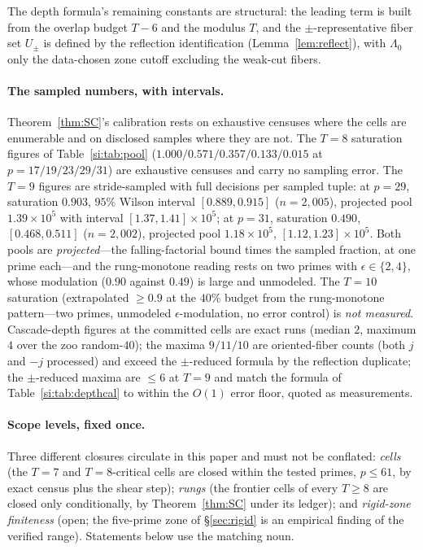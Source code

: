 The depth formula's remaining constants are structural: the leading
term is built from the overlap budget $T-6$ and the modulus $T$, and the
$\pm$-representative fiber set $U_\pm$ is defined by the reflection
identification (Lemma~\ref{lem:reflect}), with $\Lambda_0$ only the
data-chosen zone cutoff excluding the weak-cut fibers.

\paragraph{The sampled numbers, with intervals.}
Theorem~\ref{thm:SC}'s calibration rests on exhaustive censuses where
the cells are enumerable and on disclosed samples where they are not.
The $T=8$ saturation figures of Table~\ref{si:tab:pool}
($1.000/0.571/0.357/0.133/0.015$ at $p=17/19/23/29/31$) are exhaustive
censuses and carry no sampling error. The $T=9$ figures are
stride-sampled with full decisions per sampled tuple: at $p=29$,
saturation $0.903$, $95\%$ Wilson interval $[0.889,0.915]$
($n=2{,}005$), projected pool $1.39\times10^5$ with interval
$[1.37,1.41]\times10^5$; at $p=31$, saturation $0.490$,
$[0.468,0.511]$ ($n=2{,}002$), projected pool $1.18\times10^5$,
$[1.12,1.23]\times10^5$. Both pools are \emph{projected}---the
falling-factorial bound times the sampled fraction, at one prime
each---and the rung-monotone reading rests on two primes with
$\epsilon\in\{2,4\}$, whose modulation ($0.90$ against $0.49$) is large
and unmodeled. The $T=10$ saturation (extrapolated $\ge 0.9$ at the
$40\%$ budget from the rung-monotone pattern---two primes, unmodeled
$\epsilon$-modulation, no error control) is \emph{not measured}. Cascade-depth figures at the
committed cells are exact runs (median $2$, maximum $4$ over the zoo
random-$40$); the maxima $9/11/10$ are oriented-fiber counts (both $j$
and $-j$ processed) and exceed the $\pm$-reduced formula by the reflection
duplicate; the $\pm$-reduced maxima are $\le 6$ at $T=9$ and match the
formula of Table~\ref{si:tab:depthcal} to within the $O(1)$ error floor,
quoted as measurements.

\paragraph{Scope levels, fixed once.}
Three different closures circulate in this paper and must not be
conflated: \emph{cells} (the $T=7$ and $T=8$-critical cells are closed
within the tested primes, $p\le 61$, by exact census plus the shear
step); \emph{rungs} (the frontier cells of every $T\ge 8$ are closed
only conditionally, by Theorem~\ref{thm:SC} under its ledger); and
\emph{rigid-zone finiteness} (open; the five-prime zone of
\S\ref{sec:rigid} is an empirical finding of the verified range).
Statements below use the matching noun.

